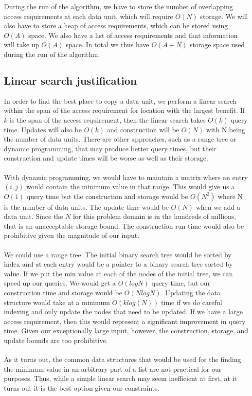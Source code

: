 During the run of the algorithm, we have to store the number of overlapping access requirements at each data unit, which will require $O(N)$ storage. We will also have to store a heap of access requirements, which can be stored using $O(A)$ space. We also have a list of access requirements and that information will take up $O(A)$ space. In total we thus have $O(A + N)$ storage space used during the run of the algorithm. 


\subsection{Linear search justification}

In order to find the best place to copy a data unit, we perform a linear search within the span of the access requirement for location with the largest benefit. If $k$ is the span of the access requirement, then the linear search takes $O(k)$ query time. Updates will also be $O(k)$ and construction will be $O(N)$ with N being the number of data units. There are other approaches, such as a range tree or dynamic programming, that may produce better query times, but their construction and update times will be worse as well as their storage. \\
\\
With dynamic programming, we would have to maintain a matrix where an entry
$(i,j)$ would contain the minimum value in that range. This would give us a
$O(1)$ query time but the construction and storage would be $O(N^2)$ where N is
the number of data units. The update time would be $O(N)$ when we add a data
unit. Since the $N$ for this problem domain is in the hundreds of millions,
that is an unacceptable storage bound. The construction run time would also be
prohibitive given the magnitude of our input. \\
\\
We could use a range tree. The initial binary search tree would be sorted by
index and at each entry would be a pointer to a binary search tree sorted by
value. If we put the min value at each of the nodes of the initial tree, we can
speed up our queries. We would get a $O(log N)$ query time, but our
construction time and storage would be $O(N log N)$. Updating the data
structure would take at a minimum $O(k log(N))$ time if we do careful indexing
and only update the nodes that need to be updated. If we have a large access
requirement, then this would represent a significant improvement in query time.
Given our exceptionally large input, however, the construction, storage, and
update bounds are too prohibitive.  \\
\\
As it turns out, the common data structures that would be used for the finding the minimum value in an arbitrary part of a list are not practical for our purposes. Thus, while a simple linear search may seem inefficient at first, at it turns out it is the best option given our constraints. 
